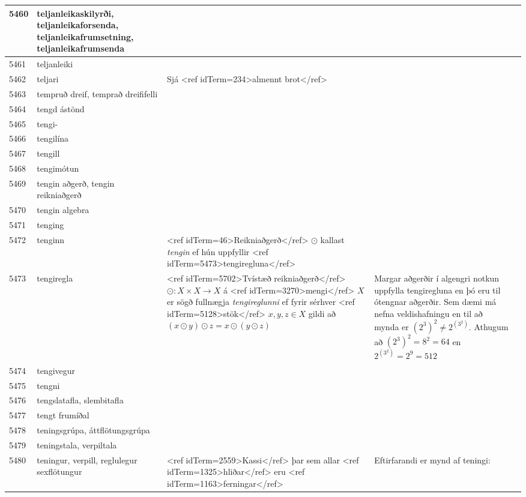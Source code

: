 \begin{longtable}{p{}|p{}|p{}|p{}|p{}}
\hline
5460 & teljanleikaskilyrði, teljanleikaforsenda, teljanleikafrumsetning, teljanleikafrumsenda &  &  &  \\
\hline
5461 & teljanleiki &  &  &  \\
\hline
5462 & teljari & Sjá <ref idTerm=234>almennt brot</ref> &  &  \\
\hline
5463 & tempruð dreif, temprað dreififelli &  &  &  \\
\hline
5464 & tengd ástönd &  &  &  \\
\hline
5465 & tengi- &  &  &  \\
\hline
5466 & tengilína &  &  &  \\
\hline
5467 & tengill &  &  &  \\
\hline
5468 & tengimótun &  &  &  \\
\hline
5469 & tengin aðgerð, tengin reikniaðgerð &  &  &  \\
\hline
5470 & tengin algebra &  &  &  \\
\hline
5471 & tenging &  &  &  \\
\hline
5472 & tenginn & <ref idTerm=46>Reikniaðgerð</ref> $\odot$ kallast \textit{tengin} ef hún uppfyllir <ref idTerm=5473>tengiregluna</ref> &  &  \\
\hline
5473 & tengiregla & <ref idTerm=5702>Tvístæð reikniaðgerð</ref> $\odot : X \times X \to X$ á <ref idTerm=3270>mengi</ref> $X$ er sögð fullnægja \textit{tengireglunni} ef fyrir sérhver <ref idTerm=5128>stök</ref> $x,y,z \in X$ gildi að $(x \odot y) \odot z = x \odot (y \odot z)$ & Margar aðgerðir í algengri notkun uppfylla tengiregluna en þó eru til ótengnar aðgerðir. Sem dæmi má nefna veldishafningu en til að mynda er $(2^3)^2 \neq 2^{(3^2)}$. Athugum að $(2^3)^2 = 8^2 = 64$ en $2^{(3^2)} = 2^9 = 512$ & \\
\hline
5474 & tengivegur &  &  &  \\
\hline
5475 & tengni &  &  &  \\
\hline
5476 & tengslatafla, slembitafla &  &  &  \\
\hline
5477 & tengt frumíðal &  &  &  \\
\hline
5478 & teningsgrúpa, áttflötungsgrúpa &  &  &  \\
\hline
5479 & teningstala, verpiltala &  &  &  \\
\hline
5480 & teningur, verpill, reglulegur sexflötungur & <ref idTerm=2559>Kassi</ref> þar sem allar <ref idTerm=1325>hliðar</ref> eru <ref idTerm=1163>ferningar</ref> & Eftirfarandi er mynd af teningi:


\end{longtable}
